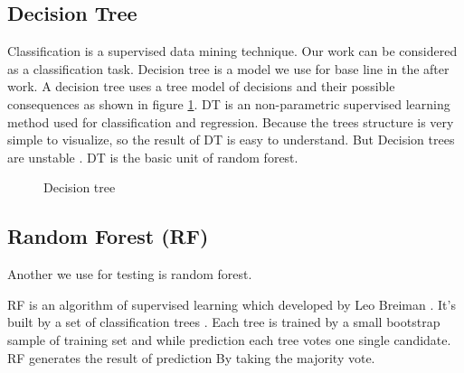 \subsection{ Decision Tree} %
Classification is a supervised data mining technique. Our work can be considered as a classification task. Decision tree is a model we use for base line in the after work. A decision tree uses a tree model of decisions and their possible consequences as shown in figure \ref{fig:detrees}.  DT is an non-parametric supervised learning method used for classification and regression. Because the trees structure is very simple to visualize, so the result of DT is easy to understand. But Decision trees are unstable \cite{breiman1996bagging}. DT is the basic unit of random forest.
\begin{figure}[!h]
\center
{}

\caption{Decision tree}
\label{fig:detrees}

\end{figure}

\subsection{Random Forest (RF)} %
\label{random_forest}
 Another we use for testing is random forest.

RF is an algorithm of supervised learning which developed by Leo Breiman \cite{breiman2001random}. It's built by a set of classification trees \cite{breiman1984classification}. Each tree is trained by a small bootstrap sample of training set and while prediction each tree votes one single candidate. RF generates the result of prediction By taking the majority vote. 

